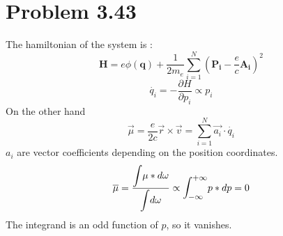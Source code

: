 \documentclass{article}
\begin{document}
\section*{Problem 3.43} %
\label{sec:problem_3_43}
	The hamiltonian of the system is :
	$$\boldsymbol{H}=e\phi (\boldsymbol{q})+\frac{1}{2m_e}\sum_{i=1}^{N}(\boldsymbol{P_i}-\frac{e}{c}\boldsymbol{A_i})^2$$
	$$\dot{q_i}=-\frac{\partial{H}}{\partial{p_i}}\propto p_i$$
	On the other hand 
	$$\vec\mu=\frac{e}{2c}\vec{r}\times\vec{v}=\sum_{i=1}^{N}\vec{a_i}\cdot \dot{q_i}$$
	$a_i$ are vector coefficients depending on the position coordinates.
	$$\overline\mu=\frac{\mathlarger{\int}\mu*d\omega}{\mathlarger{\int}d\omega}\propto\mathlarger{\int_{ - \infty }^{ + \infty }}p*dp=0$$
	The integrand is an odd function of $p$, so it vanishes.
\end{document}
